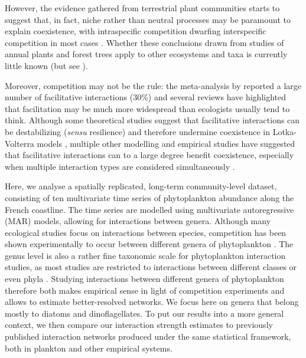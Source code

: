 \documentclass[10pt]{article}
\begin{document}
However, the evidence gathered from terrestrial plant communities
starts to suggest that, in fact, niche rather than neutral processes
may be paramount to explain coexistence, with intraspecific competition
dwarfing interspecific competition in most cases \citep{adler_coexistence_2010,adler_competition_2018}.
Whether these conclusions drawn from studies of annual plants and
forest trees apply to other ecosystems and taxa is currently little
known (but see \citealt{mutshinda_what_2009}).

Moreover, competition may not
be the rule: the meta-analysis by \citet{adler_competition_2018}
reported a large number of facilitative interactions (30\%) and several
reviews \citep{brooker_facilitation_2008,mcintire2014facilitation}
have highlighted that facilitation may be much more widespread than
ecologists usually tend to think. Although some theoretical studies
suggest that facilitative interactions can be destabilizing (\emph{sensu}
resilience) and therefore undermine coexistence in Lotka-Volterra
models \citep{coyte_ecology_2015}, multiple other modelling \citep{gross_positive_2008}
and empirical \citep{brooker_facilitation_2008,cavieres2009facilitative}
studies have suggested that facilitative interactions can to a large
degree benefit coexistence, especially when multiple interaction types
are considered simultaneously \citep{mougi2012diversity,garcia2018effect}.

Here, we analyse a spatially replicated, long-term community-level
dataset, consisting of ten multivariate time series of phytoplankton
abundance along the French coastline. The time series are modelled
using multivariate autoregressive (MAR) models, allowing for interactions
between genera. Although many ecological studies focus on interactions
between species, competition has been shown experimentally to occur
between different genera of phytoplankton \citep{titman_ecological_1976,descamps-julien_stable_2005}.
The genus level is also a rather fine taxonomic scale for phytoplankton
interaction studies, as most studies are restricted to interactions
between different classes or even phyla \citep{ives_estimating_2003,hampton_sixty_2008,griffiths_phytoplankton_2015}.
Studying interactions between different genera of phytoplankton therefore
both makes empirical sense in light of competition experiments and
allows to estimate better-resolved networks. We focus here on genera
that belong mostly to diatoms and dinoflagellates. To put our results
into a more general context, we then compare our interaction strength
estimates to previously published interaction networks produced under
the same statistical framework, both in plankton and other empirical
systems.
\end{document}
